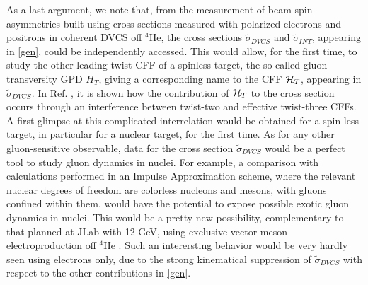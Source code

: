 \documentclass[times, twoside]{PosWhiPap}
\begin{document}
{As a last argument,
we note that, from the measurement of 
beam spin asymmetries built using 
cross sections measured with polarized electrons and positrons
in coherent DVCS off $^4$He, the 
cross sections $\tilde 
\sigma_{DVCS}$
and $\tilde 
\sigma_{INT}$,
appearing in \eqref{gen},
could be independently accessed.
This would allow,
for the first time, 
to study the other leading twist CFF of a spinless target,
the so called  gluon transversity GPD $H_T$, giving a corresponding
name to the CFF ${\cal{H}}_T$, appearing in
$\tilde  \sigma_{DVCS}$. In Ref. 
\cite{Belitsky:2008bz}, it is shown how
the contribution of ${\cal{H}}_T$ to the cross section
occurs through an interference between twist-two
and effective twist-three CFFs. A first glimpse at this complicated interrelation
would be obtained for a spin-less target, in particular for a nuclear target,
for the first time.
As for any other gluon-sensitive observable, data for the cross section
$\tilde  \sigma_{DVCS}$ would be a perfect tool to study gluon dynamics in nuclei. For example, a comparison with calculations performed in an Impulse Approximation scheme, where the relevant nuclear degrees of freedom
are colorless nucleons and mesons, with gluons confined within them, would
have the potential to expose possible exotic gluon dynamics in nuclei.
This would be a pretty new possibility, complementary to that planned at JLab
with 12 GeV, using exclusive vector meson electroproduction off
$^4$He \cite{Armstrong:2017zcm}.
Such an interersting behavior would be very hardly seen using electrons only,
due to the strong kinematical suppression of $\tilde  \sigma_{DVCS}$ with respect to
the other contributions in \eqref{gen}.
}
\end{document}
